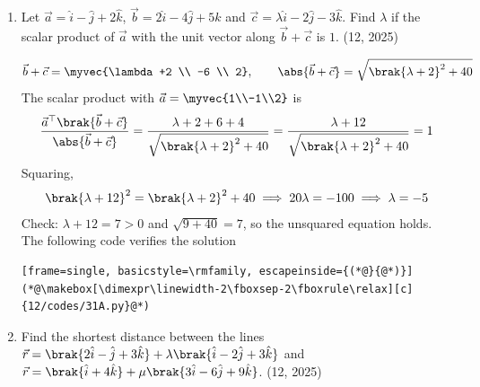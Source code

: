 \begin{enumerate}[label=\thesubsection.\arabic*, ref=\thesubsection.\theenumi]
\item
Let $\vec{a} = \hat{i} - \hat{j} + 2\hat{k}$, $\vec{b} = 2\hat{i} - 4\hat{j} + 5\hat{k}$ and $\vec{c} = \lambda\hat{i} - 2\hat{j} - 3\hat{k}$. Find $\lambda$ if the scalar product of $\vec{a}$ with the unit vector along $\vec{b} + \vec{c}$ is $1$.
\hfill (12, 2025)

\solution
\begin{align}
	\vec{b} + \vec{c} = \myvec{\lambda+2 \\ -6 \\ 2}, \qquad \abs{\vec{b}+\vec{c}} = \sqrt{\brak{\lambda+2}^2 + 40}
\end{align}
The scalar product with $\vec{a} = \myvec{1\\-1\\2}$ is
\begin{align}
	\frac{\vec{a}^{\top}\brak{\vec{b}+\vec{c}}}{\abs{\vec{b}+\vec{c}}} = \frac{\lambda + 2 + 6 + 4}{\sqrt{\brak{\lambda+2}^2 + 40}} = \frac{\lambda+12}{\sqrt{\brak{\lambda+2}^2+40}} = 1
\end{align}
Squaring,
\begin{align}
	\brak{\lambda+12}^2 = \brak{\lambda+2}^2 + 40 \implies 20\lambda = -100 \implies \lambda = -5
\end{align}
Check: $\lambda + 12 = 7 > 0$ and $\sqrt{9 + 40} = 7$, so the unsquared equation holds.
The following code verifies the solution
\begin{lstlisting}[frame=single, basicstyle=\rmfamily, escapeinside={(*@}{@*)}]
(*@\makebox[\dimexpr\linewidth-2\fboxsep-2\fboxrule\relax][c]{12/codes/31A.py}@*)
\end{lstlisting}

\item
Find the shortest distance between the lines $\vec{r} = \brak{2\hat{i} - \hat{j} + 3\hat{k}} + \lambda\brak{\hat{i} - 2\hat{j} + 3\hat{k}}$ and $\vec{r} = \brak{\hat{i} + 4\hat{k}} + \mu\brak{3\hat{i} - 6\hat{j} + 9\hat{k}}$.
\hfill (12, 2025)


\end{enumerate}
